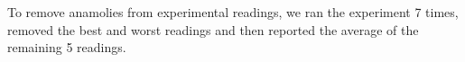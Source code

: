 To remove anamolies from experimental readings, we ran the experiment
7 times, removed the best and worst readings and then reported the
average of the remaining 5 readings.

%
%
%
%
%
%
%
%
%
%
%
%
%
%


